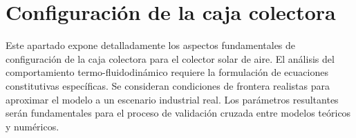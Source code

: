 \section{Configuración de la caja colectora}
\label{sec:cap05_caja}

Este apartado expone detalladamente los aspectos fundamentales de configuración de la caja colectora para el colector solar de aire.
El análisis del comportamiento termo-fluidodinámico requiere la formulación de ecuaciones constitutivas específicas.
Se consideran condiciones de frontera realistas para aproximar el modelo a un escenario industrial real.
Los parámetros resultantes serán fundamentales para el proceso de validación cruzada entre modelos teóricos y numéricos.
